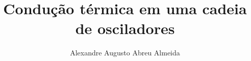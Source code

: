 \documentclass[master,american]{ThesisPUC}
\author{Alexandre Augusto Abreu Almeida}
\title{Condução térmica em uma cadeia de osciladores}
\begin{document}
  
  
  
  
  
  
  
  \arial
  \nocite{*}
  
  \normalfont
%  
\end{document}
